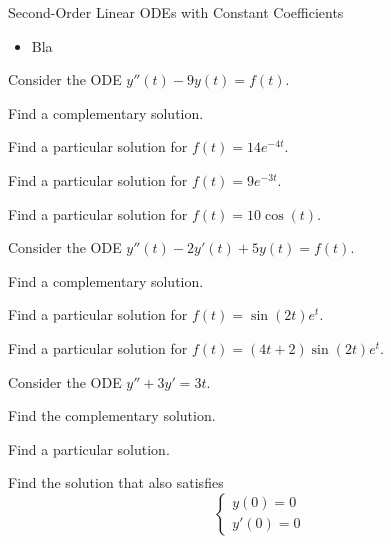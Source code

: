 \begin{module}{Second-Order Linear ODEs with Constant Coefficients}
	\label{2nd:solving}

	
	
\end{module}



\begin{lesson}

	\begin{itemize}
		\item Bla
	\end{itemize}
	

\end{lesson}




\newpage

\question
	Consider the ODE \quad $y''(t) -9y(t) = f(t)$.
\begin{parts}
	\item Find a complementary solution.
	\item Find a particular solution for $f(t) = 14 e^{-4t}$.
	\item Find a particular solution for $f(t) = 9 e^{-3t}$.
	\item Find a particular solution for $f(t) = 10\cos(t)$.
\end{parts}

\bookonlynewpage


\question
	Consider the ODE \quad $y''(t) -2y'(t)+5y(t) = f(t)$. %
\begin{parts}
	\item Find a complementary solution.
	\item Find a particular solution for $f(t) = \sin(2t)e^t$.
	\item Find a particular solution for $f(t) = (4t+2)\sin(2t)e^t$.
\end{parts}




\bookonlynewpage


\question
	Consider the ODE \quad $y'' + 3y' = 3t$.
\begin{parts}
	\item Find the complementary solution.
	\item Find a particular solution.
	\item Find the solution that also satisfies
	$$ \begin{cases}
		y(0)=0 \\
		y'(0)=0
	\end{cases}$$
\end{parts}








